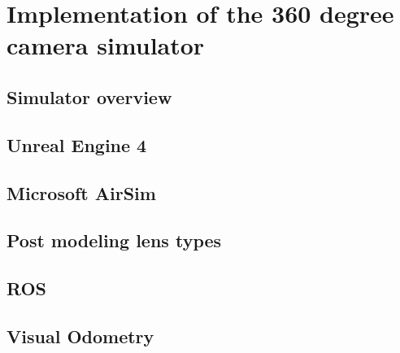 
\chapter{Implementation of the 360 degree camera simulator}

\section{Simulator overview}

\section{Unreal Engine 4}

\section{Microsoft AirSim}

\section{Post modeling lens types}

\section{ROS}

\section{Visual Odometry}



